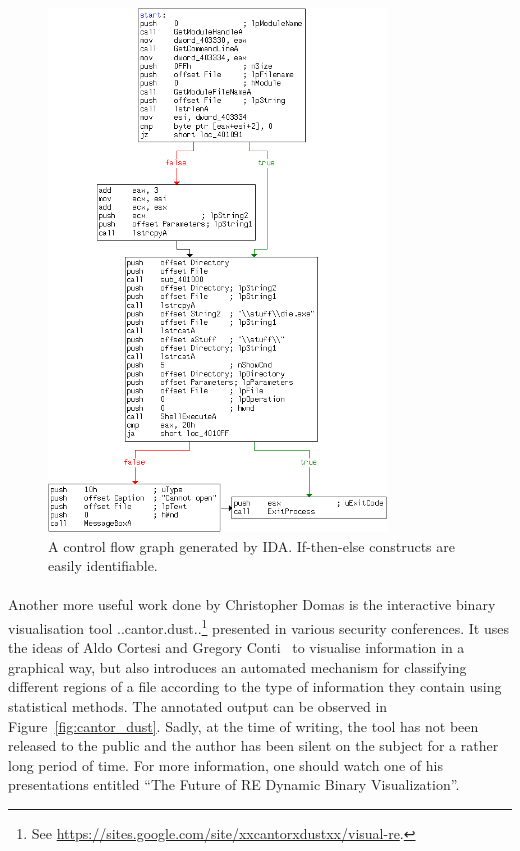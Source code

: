\begin{figure}
	\centering
	\includegraphics[width=0.8\textwidth]{reverse_engineering/control_flow_graph.png}
	\caption{A control flow graph generated by IDA. If-then-else constructs are easily identifiable.}
	\label{fig:control_flow_graph}
\end{figure}

\paragraph{}
Another more useful work done by Christopher Domas is the interactive binary visualisation tool ..cantor.dust..\footnote{See \url{https://sites.google.com/site/xxcantorxdustxx/visual-re}.} presented in various security conferences. It uses the ideas of Aldo Cortesi and Gregory Conti~\cite{conti2008visual} to visualise information in a graphical way, but also introduces an automated mechanism for classifying different regions of a file according to the type of information they contain using statistical methods. The annotated output can be observed in Figure~\ref{fig:cantor_dust}. Sadly, at the time of writing, the tool has not been released to the public and the author has been silent on the subject for a rather long period of time. For more information, one should watch one of his presentations entitled “The Future of RE Dynamic Binary Visualization”.

